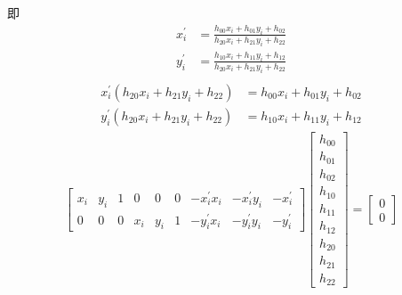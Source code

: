 即
\begin{align*}
    x_{i}^{\prime}&=\frac{h_{00} x_{i}+h_{01} y_{i}+h_{02}}{h_{20} x_{i}+h_{21} y_{i}+h_{22}} \\
    y_{i}^{\prime}&=\frac{h_{10} x_{i}+h_{11} y_{i}+h_{12}}{h_{20} x_{i}+h_{21} y_{i}+h_{22}} \\
\end{align*}
\begin{align*}
    x_{i}^{\prime}\left(h_{20} x_{i}+h_{21} y_{i}+h_{22}\right)&=h_{00} x_{i}+h_{01} y_{i}+h_{02} \\
    y_{i}^{\prime}\left(h_{20} x_{i}+h_{21} y_{i}+h_{22}\right)&=h_{10} x_{i}+h_{11} y_{i}+h_{12}
\end{align*}
\begin{align*}
    \begin{bmatrix}
        x_{i} & y_{i} & 1 & 0 & 0 & 0 & -x_{i}^{\prime} x_{i} & -x_{i}^{\prime} y_{i} & -x_{i}^{\prime} \\
        0 & 0 & 0 & x_{i} & y_{i} & 1 & -y_{i}^{\prime} x_{i} & -y_{i}^{\prime} y_{i} & -y_{i}^{\prime}
    \end{bmatrix}\begin{bmatrix}
        h_{00} \\
        h_{01} \\
        h_{02} \\
        h_{10} \\
        h_{11} \\
        h_{12} \\
        h_{20} \\
        h_{21} \\
        h_{22}
    \end{bmatrix}=\begin{bmatrix}
        0\\0
    \end{bmatrix}
\end{align*}

